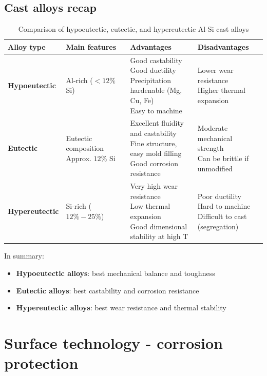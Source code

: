 \documentclass{article}
\begin{document}
\subsection{Cast alloys recap}
\begin{table}[ht!]
  \centering
  \caption*{Comparison of hypoeutectic, eutectic, and hypereutectic Al-Si cast alloys}
  \begin{tabular}{|l|l|l|l|}
    \hline
    \textbf{Alloy type} & \textbf{Main features} & \textbf{Advantages} & \textbf{Disadvantages}\\
    \hline \textbf{Hypoeutectic} & Al-rich ($<12\%$ Si) & \makecell[l]{Good castability\\Good ductility\\Precipitation hardenable (Mg, Cu, Fe)\\Easy to machine} & \makecell[l]{Lower wear resistance\\Higher thermal expansion}\\
    \hline \textbf{Eutectic} & \makecell[l]{Eutectic composition\\Approx. $12\%$ Si} & \makecell[l]{Excellent fluidity and castability\\Fine structure, easy mold filling\\Good corrosion resistance} & \makecell[l]{Moderate mechanical strength\\Can be brittle if unmodified}\\
    \hline \textbf{Hypereutectic} & Si-rich ($12\% - 25\%$) & \makecell[l]{Very high wear resistance\\Low thermal expansion\\Good dimensional stability at high T} & \makecell[l]{Poor ductility\\Hard to machine\\Difficult to cast (segregation)}\\
    \hline
  \end{tabular}
\end{table}

In summary:
\begin{itemize}
  \item \textbf{Hypoeutectic alloys}: best mechanical balance and toughness
  \item \textbf{Eutectic alloys}: best castability and corrosion resistance
  \item \textbf{Hypereutectic alloys}: best wear resistance and thermal stability
\end{itemize}

\section{Surface technology - corrosion protection}
\end{document}
